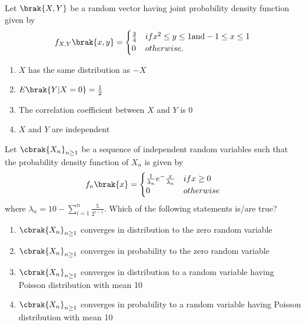 \item Let $\brak{X, Y}$ be a random vector having joint probability density function given by 
\begin{align}
f_{X, Y}\brak{x, y} = \begin{cases} \frac{3}{4} & if x^{2} \leq y \leq 1 \text{and} -1 \leq x \leq 1 \\ 0 & otherwise.
\end{cases}
\end{align}
\begin{enumerate}
\item $X$ has the same distribution as $-X$
\item $E\brak{Y | X =0} = \frac{1}{2}$
\item The correlation coefficient between $X$ and $Y$ is 0
\item $X$ and $Y$ are independent
\end{enumerate}


\item Let $\cbrak{X_{n}}_{n \geq 1}$ be a sequence of independent random variables such that the probability density function of ${X}_{n}$ is given by 
\begin{align}
f_{n}\brak{x} = \begin{cases} \frac{1}{\lambda_{n}}e^-\frac{x}{\lambda_{n}} & if x \geq 0 \\ 0 & otherwise
\end{cases} 
\end{align}
where $\lambda_{n} = 10 - \sum_{i = 1} ^{n} \frac{5}{2 ^{i-1}}.$ Which of the following statements is/are true?
\begin{enumerate}
\item $\cbrak{X_{n}}_{ n \geq 1}$ converges in distribution to the zero random variable
\item $\cbrak{X_{n}}_{ n \geq 1}$ converges in probability to the zero random variable
\item $\cbrak{X_{n}}_{ n \geq 1}$ converges in distribution to a random variable having Poisson distribution with mean 10
\item $\cbrak{X_{n}}_{ n \geq 1}$ converges in probability to a random variable having Poisson distribution with mean 10
\end{enumerate}
%

